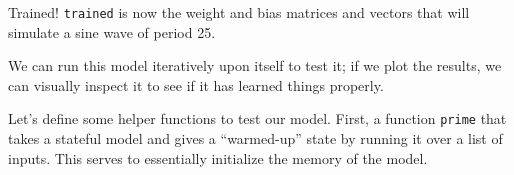 \documentclass[]{article}
\newenvironment{Shaded}{}{}
\newcommand{\CommentTok}[1]{\textcolor[rgb]{0.38,0.63,0.69}{\textit{#1}}}
\newcommand{\DataTypeTok}[1]{\textcolor[rgb]{0.56,0.13,0.00}{#1}}
\newcommand{\DecValTok}[1]{\textcolor[rgb]{0.25,0.63,0.44}{#1}}
\newcommand{\FunctionTok}[1]{\textcolor[rgb]{0.02,0.16,0.49}{#1}}
\newcommand{\KeywordTok}[1]{\textcolor[rgb]{0.00,0.44,0.13}{\textbf{#1}}}
\newcommand{\NormalTok}[1]{#1}
\newcommand{\OtherTok}[1]{\textcolor[rgb]{0.00,0.44,0.13}{#1}}
\begin{document}
\begin{Shaded}
\end{Shaded}

Trained! \texttt{trained} is now the weight and bias matrices and vectors that
will simulate a sine wave of period 25.

We can run this model iteratively upon itself to test it; if we plot the
results, we can visually inspect it to see if it has learned things properly.

Let's define some helper functions to test our model. First, a function
\texttt{prime} that takes a stateful model and gives a ``warmed-up'' state by
running it over a list of inputs. This serves to essentially initialize the
memory of the model.
\end{document}
